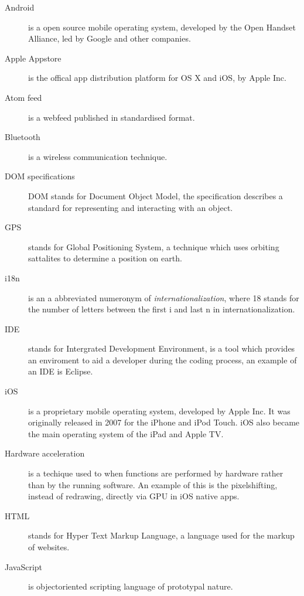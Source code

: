 

\begin{description}
\item[Android] is a open source mobile operating system, developed by the Open Handset Alliance, led by Google and other companies.\cite{Inc.2012}

\item[Apple Appstore] is the offical app distribution platform for OS X and iOS, by Apple Inc.

\item[Atom feed] is a webfeed published in standardised format.

\item[Bluetooth] is a wireless communication technique.

\item[DOM specifications] DOM stands for Document Object Model, the specification describes a standard for representing and interacting with an object.

\item[GPS] stands for Global Positioning System, a technique which uses orbiting sattalites to determine a position on earth.

\item[i18n] is an a abbreviated numeronym of \emph{internationalization}, where 18 stands for the number of letters between the first i and last n in internationalization.

\item[IDE] stands for Intergrated Development Environment, is a tool which provides an enviroment to aid a developer during the coding process, an example of an IDE is Eclipse.

\item[iOS] is a proprietary mobile operating system, developed by Apple Inc. It was originally released in 2007 for the iPhone and iPod Touch. iOS also became the main operating system of the iPad and Apple TV.\cite{Sylvain2012}

\item[Hardware acceleration] is a techique used to when functions are performed by hardware rather than by the running software. An example of this is the pixelshifting, instead of redrawing, directly via GPU in iOS native apps.

\item[HTML] stands for Hyper Text Markup Language, a language used for the markup of websites.

\item[JavaScript] is objectoriented scripting language of prototypal nature.


\end{description}
